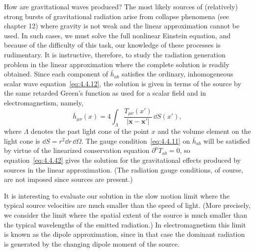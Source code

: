 How are gravitational waves produced? The most likely sources of (relatively)
strong bursts of gravitational radiation arise from collapse phenomena (see
chapter 12) where gravity is not weak and the linear approximation cannot be used.
In such cases, we must solve the full nonlinear Einstein equation, and because of the
difficulty of this task, our knowledge of these processes is rudimentary. It is
instructive, therefore, to study the radiation generation problem in the linear
approximation where the complete solution is readily obtained. Since each
component of \(\bar h_{ab}\) satisfies the ordinary, inhomogeneous scalar wave
equation~\eqref{eq:4.4.12}, the solution is given in terms of the source by the same
retarded Green's function as used for a scalar field and in electromagnetism, namely,
\begin{equation}
  \bar h_{\mu\nu}(x)=4\int_\Lambda
    \frac{T_{\mu\nu}(x')}{\lvert\mathbf{x}-\mathbf{x}'\rvert}\,\dd S(x') ,
  \tag{4.4.42}\label{eq:4.4.42}
\end{equation}
where \(\Lambda\) denotes the past light cone of the point \(x\) and the volume
element on the light cone is \(\dd S=r^2\dd r\,\dd\Omega\). The gauge
condition~\eqref{eq:4.4.11} on \(\bar h_{ab}\) will be satisfied by virtue of the
linearized conservation equation \(\partial^aT_{ab}=0\), so
equation~\eqref{eq:4.4.42} gives the solution for the gravitational effects produced
by sources in the linear approximation. (The radiation gauge conditions, of course,
are not imposed since sources are present.)

It is interesting to evaluate our solution in the slow motion limit where the typical
source velocities are much smaller than the speed of light. (More precisely, we
consider the limit where the spatial extent of the source is much smaller than the
typical wavelengths of the emitted radiation.) In electromagnetism this limit is
known as the dipole approximation, since in that case the dominant radiation is
generated by the changing dipole moment of the source.


